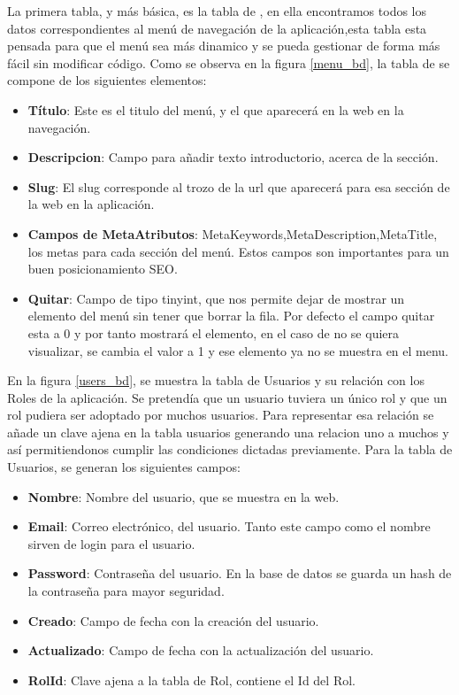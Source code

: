 \vspace{5 mm}

La primera tabla, y más básica, es la tabla de , en ella encontramos todos los datos correspondientes al menú de navegación de la aplicación,esta tabla esta pensada para que el menú sea más dinamico y se pueda gestionar de forma más fácil sin modificar código. Como se observa en la figura \ref{menu_bd}, la tabla de  se compone de los siguientes elementos:

\begin{itemize}

\item \textbf{Título}: Este es el titulo del menú, y el que aparecerá en la web en la navegación.
\item \textbf{Descripcion}: Campo para añadir texto introductorio, acerca de la sección.
\item \textbf{Slug}: El slug corresponde al trozo de la url que aparecerá para esa sección de la web en la aplicación.
\item \textbf{Campos de MetaAtributos}: MetaKeywords,MetaDescription,MetaTitle, los metas para cada sección del menú. Estos campos son importantes para un buen posicionamiento SEO.
\item \textbf{Quitar}: Campo de tipo tinyint, que nos permite dejar de mostrar un elemento del menú sin tener que borrar la fila. Por defecto el campo quitar esta a 0 y por tanto mostrará el elemento, en el caso de no se quiera visualizar, se cambia el valor a 1 y ese elemento ya no se muestra en el menu.

\end{itemize}

\vspace{5 mm}

En la figura \ref{users_bd}, se muestra la tabla de Usuarios y su relación con los Roles de la aplicación. Se pretendía que un usuario tuviera un único rol y que un rol pudiera ser adoptado por muchos usuarios. Para representar esa relación se añade un clave ajena en la tabla usuarios generando una relacion uno a muchos y así permitiendonos cumplir las condiciones dictadas previamente. Para la tabla de Usuarios, se generan los siguientes campos:

\begin{itemize}

\item \textbf{Nombre}: Nombre del usuario, que se muestra en la web.
\item \textbf{Email}: Correo electrónico, del usuario. Tanto este campo como el nombre sirven de login para el usuario.
\item \textbf{Password}: Contraseña del usuario. En la base de datos se guarda un hash de la contraseña para mayor seguridad.
\item \textbf{Creado}: Campo de fecha con la creación del usuario.
\item \textbf{Actualizado}: Campo de fecha con la actualización del usuario.
\item \textbf{RolId}: Clave ajena a la tabla de Rol, contiene el Id del Rol.

\end{itemize}

